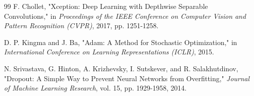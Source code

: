 \begin{thebibliography}{99}
F. Chollet, "Xception: Deep Learning with Depthwise Separable Convolutions," in \textit{Proceedings of the IEEE Conference on Computer Vision and Pattern Recognition (CVPR)}, 2017, pp. 1251-1258.

D. P. Kingma and J. Ba, "Adam: A Method for Stochastic Optimization," in \textit{International Conference on Learning Representations (ICLR)}, 2015.

N. Srivastava, G. Hinton, A. Krizhevsky, I. Sutskever, and R. Salakhutdinov, "Dropout: A Simple Way to Prevent Neural Networks from Overfitting," \textit{Journal of Machine Learning Research}, vol. 15, pp. 1929-1958, 2014.

\end{thebibliography}
